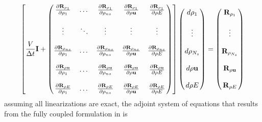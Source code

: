 \documentclass[a4paper]{report}
\begin{document}
\begin{equation}
  \left[ 
    \frac{V}{\Delta t} \mi + 
    \begin{pmatrix}
      \tdiff{\rho_1}{\rho_1}    & \dots  & \tdiff{\rho_{ns}}{\rho_1}    & \tdiff{\rho \vu}{\rho_1}    & \tdiff{\rho E}{\rho_1} \\ \\
      \vdots                    & \ddots & \vdots                       & \vdots                      & \vdots                   \\ \\
      \tdiff{\rho_1}{\rho_{ns}} & \dots  & \tdiff{\rho_{ns}}{\rho_{ns}} & \tdiff{\rho \vu}{\rho_{ns}} & \tdiff{\rho E}{\rho_{ns}} \\ \\
      \tdiff{\rho_1}{\rho \vu}  & \dots  & \tdiff{\rho_{ns}}{\rho \vu}  & \tdiff{\rho \vu}{\rho \vu}  & \tdiff{\rho E}{\rho \vu} \\ \\
      \tdiff{\rho_1}{\rho E}    & \dots  & \tdiff{\rho_{ns}}{\rho E}    & \tdiff{\rho \vu}{\rho E}    & \tdiff{\rho E}{\rho E}
    \end{pmatrix}
  \right]
  \begin{pmatrix}
    d \rho_1     \\ \\
    \vdots       \\ \\
    d \rho_{N_s} \\ \\
    d \rho \vu   \\ \\
    d \rho E
  \end{pmatrix}
  =
  \begin{pmatrix}
    \res{\rho_1}     \\ \\
    \vdots           \\ \\
    \res{\rho_{N_s}} \\ \\
    \res{\rho \vu}   \\ \\
    \res{\rho E}
  \end{pmatrix}
  \label{fc-flow}
\end{equation}
assuming all linearizations are exact, the adjoint system of equations that
results from the fully coupled formulation in  is
\end{document}
